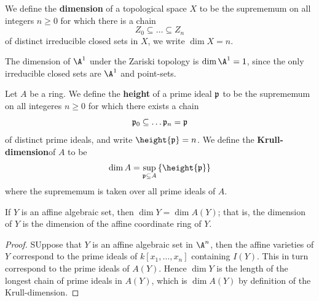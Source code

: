 \begin{definition}
    We define the \textbf{dimension} of a topological space $X$ to be the
    suprememum on all integers  $n \geq 0$ for which there is a chain
    \begin{equation*}
        Z_0 \subseteq \dots \subseteq Z_n
    \end{equation*}
    of distinct irreducible closed sets in $X$, we write  $\dim{X}=n$.
\end{definition}

\begin{example}\label{example_1.7}
    The dimension of $\A^1$ under the Zariski topology is  $\dim{\A^1}=1$, since
    the only irreducible closed sets are $\A^1$ and point-sets.
\end{example}

\begin{definition}
    Let $A$ be a ring. We define the  \textbf{height} of a prime ideal $\mathfrak{p}$ to
    be the suprememum on all integeres  $n \geq 0$ for which there exists a
    chain
    \begin{equation*}
        \mathfrak{p}_0 \subseteq \dots \mathfrak{p}_n=\mathfrak{p}
    \end{equation*}
    of distinct prime ideals, and write $\height{\pf}=n$. We define the
    \textbf{Krull-dimension}of $A$ to be
    \begin{equation*}
        \dim{A}=\sup_{\pf \subseteq A}{\{\height{\pf}\}}
    \end{equation*}
    where the suprememum is taken over all prime ideals of $A$.
\end{definition}

\begin{lemma}\label{1.1.6}
    If $Y$ is an affine algebraic set, then  $\dim{Y}=\dim{A(Y)}$; that is, the
    dimension of $Y$ is the dimension of the affine coordinate ring of  $Y$.
\end{lemma}
\begin{proof}
    SUppose that $Y$ is an affine algebraic set in  $\A^n$, then the affine
    varieties of  $Y$ correspond to the prime ideals of  $k[x_1, \dots, x_n]$
    containing $I(Y)$. This in turn correspond to the prime ideals of $A(Y)$.
    Hence $\dim{Y}$ is the length of the longest chain of prime ideals in
    $A(Y)$, which is $\dim{A(Y)}$ by definition of the Krull-dimension.
\end{proof}

